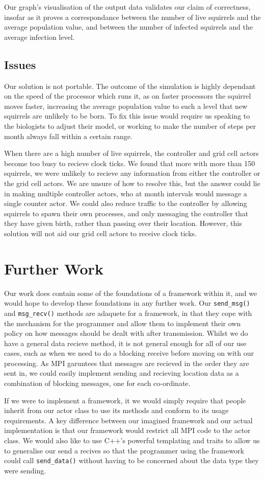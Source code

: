 \documentclass[oneside]{article}
\begin{document}
Our graph's visualisation of the output data validates our claim of correctness, insofar as it proves a correspondance between the number of live squirrels and the average population value, and between the number of infected squirrels and the average infection level.

\subsection{Issues}\label{sec:is}
Our solution is not portable. The outcome of the simulation is highly dependant on the speed of the processor which runs it, as on faster processors the squirrel moves faster, increasing the average population value to such a level that new squirrels are unlikely to be born. To fix this issue would require us speaking to the biologists to adjust their model, or working to make the number of steps per month always fall within a certain range.

When there are a high number of live squirrels, the controller and grid cell actors become too busy to recieve clock ticks. We found that more with more than 150 squirrels, we were unlikely to recieve any information from either the controller or the grid cell actors. We are unsure of how to resolve this, but the answer could lie in making multiple controller actors, who at month intervals would message a single counter actor. We could also reduce traffic to the controller by allowing squirrels to spawn their own processes, and only messaging the controller that they have given birth, rather than passing over their location. However, this solution will not aid our grid cell actors to receive clock ticks.

\section{Further Work}\label{sec:fur}
Our work does contain some of the foundations of a framework within it, and we would hope to develop these foundations in any further work. Our \texttt{send\_msg()} and \texttt{msg\_recv()} methods are adaquete for a framework, in that they cope with the mechanism for the programmer and allow them to implement their own policy on how messages should be dealt with after transmission.  Whilst we do have a general data recieve method, it is not general enough for all of our use cases, such as when we need to do a blocking receive before moving on with our processing. As MPI garuntees that messages are recieved in the order they are sent in, we could easily implement sending and recieving location data as a combination of blocking messages, one for each co-ordinate.

If we were to implement a framework, it we would simply require that people inherit from our actor class to use its methods and conform to its usage requirements. A key difference between our imagined framework and our actual implementation is that our framework would restrict all MPI code to the actor class. We would also like to use C++'s powerful templating and traits to allow us to generalise our send a recives so that the programmer using the framework could call \texttt{send\_data()} without having to be concerned about the data type they were sending.


\end{document}

